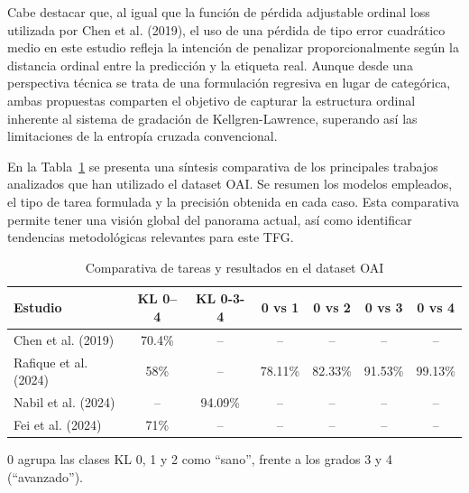 \documentclass[11pt,spanish,listoffigures,listoftables]{tfgetsinf}
\begin{document}
Cabe destacar que, al igual que la función de pérdida adjustable ordinal loss utilizada por Chen et al. (2019), el uso de una pérdida de tipo 
error cuadrático medio en este estudio refleja la intención de penalizar proporcionalmente según la distancia ordinal entre la predicción y 
la etiqueta real. Aunque desde una perspectiva técnica se trata de una formulación regresiva en lugar de categórica, ambas propuestas comparten 
el objetivo de capturar la estructura ordinal inherente al sistema de gradación de Kellgren-Lawrence, superando así las limitaciones de la entropía 
cruzada convencional.

En la Tabla~\ref{tab:comparative_oai} se presenta una síntesis comparativa de los principales trabajos analizados que han utilizado el dataset OAI. 
Se resumen los modelos empleados, el tipo de tarea formulada y la precisión obtenida en cada caso. Esta 
comparativa permite tener una visión global del panorama actual, así como identificar tendencias metodológicas relevantes para este TFG.

\begin{table}[h]
    \centering
    \caption{Comparativa de tareas y resultados en el dataset OAI}
    \label{tab:comparative_oai}
    \begin{tabular}{lcccccc}
        \toprule
        \textbf{Estudio} & \textbf{KL 0--4} & \textbf{KL 0\raisebox{0.5ex}{*}-3-4} & \textbf{0 vs 1} & \textbf{0 vs 2} & \textbf{0 vs 3} & \textbf{0 vs 4} \\
        \midrule
        Chen et al. (2019)     & 70.4\% & --        & --        & --        & --        & --        \\
        Rafique et al. (2024)  & 58\%   & --        & 78.11\%   & 82.33\%   & 91.53\%   & 99.13\%   \\
        Nabil et al. (2024)    & --     & 94.09\%   & --        & --        & --        & --        \\
        Fei et al. (2024)      & 71\%   & --        & --        & --        & --        & --        \\
        \bottomrule
    \end{tabular}
\end{table}

\vspace{-1ex}
\begin{flushleft}
    \footnotesize\raisebox{0.5ex}{*} 0 agrupa las clases KL 0, 1 y 2 como “sano”, frente a los grados 3 y 4 (“avanzado”).
\end{flushleft}
\end{document}
